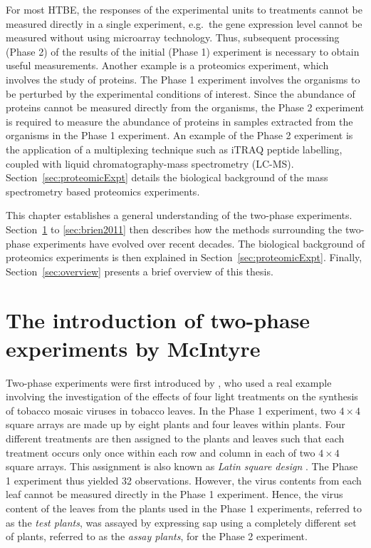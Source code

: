 \documentclass[11pt,a4paper]{article}
\begin{document}
For most HTBE, the responses of the experimental units to treatments cannot be measured directly in a single experiment, e.g.\ the gene expression level cannot be measured without using microarray technology. Thus, subsequent processing (Phase 2) of the results of the initial (Phase 1) experiment is necessary to obtain useful measurements. Another example is a proteomics experiment, which involves the study of proteins. The Phase 1 experiment involves the organisms to be perturbed by the experimental conditions of interest. Since the abundance of proteins cannot be measured directly from the organisms, the Phase 2 experiment is required to measure the abundance of proteins in samples extracted from the organisms in the Phase 1 experiment. An example of the Phase 2 experiment is the application of a multiplexing technique such as iTRAQ peptide labelling, coupled with liquid chromatography-mass spectrometry (LC-MS). Section~\ref{sec:proteomicExpt} details the biological background of the mass spectrometry based proteomics experiments. 

This chapter establishes a general understanding of the two-phase experiments. Section~\ref{sec:introTwoPhase} to \ref{sec:brien2011} then describes how the methods surrounding the two-phase experiments have evolved over recent decades. The biological background of proteomics experiments is then explained in Section~\ref{sec:proteomicExpt}. Finally, Section~\ref{sec:overview} presents a brief overview of this thesis.


\section{The introduction of two-phase experiments by McIntyre}
\label{sec:introTwoPhase}
Two-phase experiments were first introduced by \cite{McIntyre1955}, who used a real example involving the investigation of the effects of four light treatments on the synthesis of tobacco mosaic viruses in tobacco leaves. In the Phase 1 experiment, two $4 \times 4$ square arrays are made up by eight plants and four leaves within plants. Four different treatments are then assigned to the plants and leaves such that each treatment occurs only once within each row and column in each of two $4 \times 4$ square arrays. This assignment is also known as \emph{Latin square design} \citep{Bailey2008}. The Phase 1 experiment thus yielded 32 observations. However, the virus contents from each leaf cannot be measured directly in the Phase 1 experiment. Hence, the virus content of the leaves from the plants used in the Phase 1 experiments, referred to as the \emph{test plants}, was assayed by expressing sap using a completely different set of plants, referred to as the \emph{assay plants}, for the Phase 2 experiment. 
\end{document}
